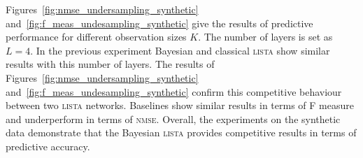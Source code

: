 \documentclass{article}
\begin{document}
Figures~\ref{fig:nmse_undersampling_synthetic} and~\ref{fig:f_meas_undesampling_synthetic} give the results of predictive performance for different observation sizes $K$. The number of layers is set as $L=4$. In the previous experiment Bayesian and classical \textsc{lista} show similar results with this number of layers. The results of Figures~\ref{fig:nmse_undersampling_synthetic} and~\ref{fig:f_meas_undesampling_synthetic} confirm this competitive behaviour between two \textsc{lista} networks. Baselines show similar results in terms of F measure and underperform in terms of \textsc{nmse}. Overall, the experiments on the synthetic data demonstrate that the Bayesian \textsc{lista} provides competitive results in terms of predictive accuracy.


\end{document}
